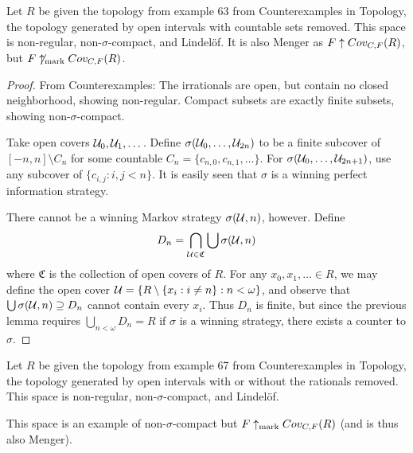   \begin{example}
  Let $R$ be given the topology from example 63 from Counterexamples in Topology, the topology generated by open intervals with countable sets removed. This space is non-regular, non-$\sigma$-compact, and Lindel\"of. It is also Menger as $F \uparrow Cov_{C,F}(R)$, but $F \not\uparrow_{\text{mark}} Cov_{C,F}(R)$.
  \end{example}

  \begin{proof}
  From Counterexamples: The irrationals are open, but contain no closed neighborhood, showing non-regular. Compact subsets are exactly finite subsets, showing non-$\sigma$-compact.

  Take open covers $\mathcal{U}_0,\mathcal{U}_1,\dots$. Define $\sigma(\mathcal{U}_0,\dots,\mathcal{U}_{2n})$ to be a finite subcover of $[-n,n]\setminus C_n$ for some countable $C_n=\{c_{n,0}, c_{n,1}, \dots\}$. For $\sigma(\mathcal{U}_0,\dots,\mathcal{U}_{2n+1})$, use any subcover of $\{c_{i,j} : i,j < n\}$. It is easily seen that $\sigma$ is a winning perfect information strategy.

  There cannot be a winning Markov strategy $\sigma(\mathcal{U},n)$, however. Define 
      \[
        D_n = \bigcap_{\mathcal{U}\in\mathfrak{C}} \bigcup\sigma(\mathcal{U},n)
      \]
  where $\mathfrak{C}$ is the collection of open covers of $R$. For any $x_0,x_1,\dots \in R$, we may define the open cover $\mathcal{U} = \{R \setminus \{x_i: i \not= n\} : n < \omega \}$, and observe that $\bigcup \sigma(\mathcal{U},n) \supseteq D_n$ cannot contain every $x_i$. Thus $D_n$ is finite, but since the previous lemma requires $\bigcup_{n<\omega} D_n = R$ if $\sigma$ is a winning strategy, there exists a counter to $\sigma$.
  \end{proof}

  \begin{example}
  Let $R$ be given the topology from example 67 from Counterexamples in Topology, the topology generated by open intervals with or without the rationals removed. This space is non-regular, non-$\sigma$-compact, and Lindel\"of.

  This space is an example of non-$\sigma$-compact but $F \uparrow_{\text{mark}} Cov_{C,F}(R)$ (and is thus also Menger).
  \end{example}

